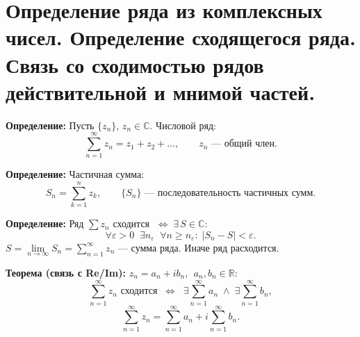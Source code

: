 \section{Определение ряда из комплексных чисел. Определение сходящегося
ряда. Связь со сходимостью рядов действительной и мнимой
частей.}\label{ux43eux43fux440ux435ux434ux435ux43bux435ux43dux438ux435-ux440ux44fux434ux430-ux438ux437-ux43aux43eux43cux43fux43bux435ux43aux441ux43dux44bux445-ux447ux438ux441ux435ux43b.-ux43eux43fux440ux435ux434ux435ux43bux435ux43dux438ux435-ux441ux445ux43eux434ux44fux449ux435ux433ux43eux441ux44f-ux440ux44fux434ux430.-ux441ux432ux44fux437ux44c-ux441ux43e-ux441ux445ux43eux434ux438ux43cux43eux441ux442ux44cux44e-ux440ux44fux434ux43eux432-ux434ux435ux439ux441ux442ux432ux438ux442ux435ux43bux44cux43dux43eux439-ux438-ux43cux43dux438ux43cux43eux439-ux447ux430ux441ux442ux435ux439.}

\textbf{Определение:} Пусть \(\{z_n\}\), \(z_n \in \mathbb{C}\).
Числовой ряд:
\[\sum_{n=1}^{\infty} z_n = z_1 + z_2 + \dots, \qquad z_n \text{ — общий член.}\]

\textbf{Определение:} Частичная сумма:
\[S_n = \sum_{k=1}^{n} z_k, \qquad \{S_n\} \text{ — последовательность частичных сумм.}\]

\textbf{Определение:} Ряд \(\sum z_n\) сходится
\(\;\Leftrightarrow\; \exists\, S \in \mathbb{C}:\)
\[\forall \varepsilon > 0 \;\; \exists n_\varepsilon \;\; \forall n \geq n_\varepsilon : \; |S_n - S| < \varepsilon.\]
\(S = \lim\limits_{n\to\infty} S_n = \sum\limits_{n=1}^{\infty} z_n\)
--- сумма ряда. Иначе ряд расходится.

\textbf{Теорема (связь с Re/Im):} \(z_n = a_n + i b_n\),
\(\;a_n, b_n \in \mathbb{R}\):
\[\sum_{n=1}^{\infty} z_n \text{ сходится} \;\;\Longleftrightarrow\;\; \exists \sum_{n=1}^{\infty} a_n \;\wedge\; \exists \sum_{n=1}^{\infty} b_n,\]
\[\sum_{n=1}^{\infty} z_n = \sum_{n=1}^{\infty} a_n + i \sum_{n=1}^{\infty} b_n.\]

